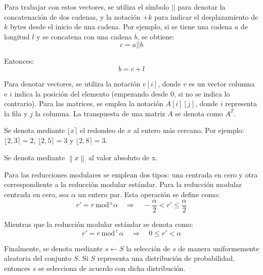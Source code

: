 Para trabajar con estos vectores, se utiliza el símbolo \(||\) para denotar la concatenación de dos cadenas, y la notación \(+k\) para indicar el desplazamiento de \(k\) bytes desde el inicio de una cadena. Por ejemplo, si se tiene una cadena \(a\) de longitud \(l\) y se concatena con una cadena \(b\), se obtiene:
\begin{equation}
	c = a || b
\end{equation}

Entonces:
\begin{equation}
	b = c + l
\end{equation}

Para denotar vectores, se utiliza la notación \(v[i]\), donde \(v\) es un vector columna e \(i\) indica la posición del elemento (empezando desde 0, si no se indica lo contrario). Para las matrices, se emplea la notación \(A[i][j]\), donde \(i\) representa la fila y \(j\) la columna. La transpuesta de una matriz \(A\) se denota como \(A^T\).
\newline

Se denota mediante \(\lfloor x \rceil\) el redondeo de \(x\) al entero más cercano. Por ejemplo: \(\lfloor 2{,}3 \rceil = 2\), \(\lfloor 2{,}5 \rceil = 3\) y \(\lfloor 2{,}8 \rceil = 3\).
\newline

Se denota mediante $\left\| x\right\|$ al valor absoluto de x.
\newline

Para las reducciones modulares se emplean dos tipos: una centrada en cero y otra correspondiente a la reducción modular estándar. Para la reducción modular centrada en cero, sea \(\alpha\) un entero par. Esta operación se define como:
\begin{equation}
	r' = r \ \text{mod}^{\pm} \alpha \quad \Longrightarrow \quad -\dfrac{\alpha}{2} < r' \le \dfrac{\alpha}{2}
\end{equation}

Mientras que la reducción modular estándar se denota como:
\begin{equation}
	r' = r \ \text{mod}^{+} \alpha \quad \Longrightarrow \quad 0 \le r' < \alpha
\end{equation}

Finalmente, se denota mediante \(s \leftarrow S\) la selección de \(s\) de manera uniformemente aleatoria del conjunto \(S\). Si \(S\) representa una distribución de probabilidad, entonces \(s\) se selecciona de acuerdo con dicha distribución.
\newpage

